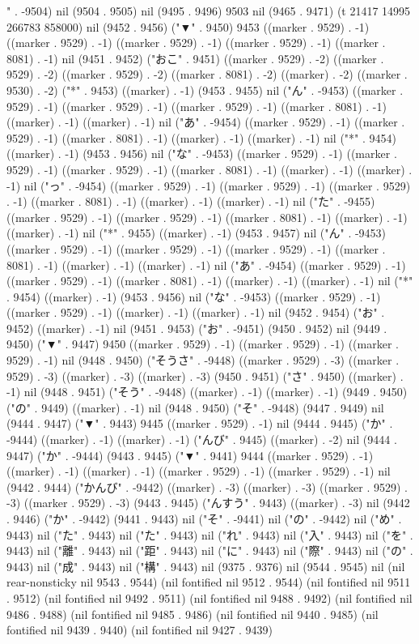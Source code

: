 " . -9504) nil (9504 . 9505) nil (9495 . 9496) 9503 nil (9465 . 9471) (t 21417 14995 266783 858000) nil (9452 . 9456) ("▼" . 9450) 9453 ((marker . 9529) . -1) ((marker . 9529) . -1) ((marker . 9529) . -1) ((marker . 9529) . -1) ((marker . 8081) . -1) nil (9451 . 9452) ("おこ" . 9451) ((marker . 9529) . -2) ((marker . 9529) . -2) ((marker . 9529) . -2) ((marker . 8081) . -2) ((marker) . -2) ((marker . 9530) . -2) ("*" . 9453) ((marker) . -1) (9453 . 9455) nil ("ん" . -9453) ((marker . 9529) . -1) ((marker . 9529) . -1) ((marker . 9529) . -1) ((marker . 8081) . -1) ((marker) . -1) ((marker) . -1) nil ("あ" . -9454) ((marker . 9529) . -1) ((marker . 9529) . -1) ((marker . 8081) . -1) ((marker) . -1) ((marker) . -1) nil ("*" . 9454) ((marker) . -1) (9453 . 9456) nil ("な" . -9453) ((marker . 9529) . -1) ((marker . 9529) . -1) ((marker . 9529) . -1) ((marker . 8081) . -1) ((marker) . -1) ((marker) . -1) nil ("っ" . -9454) ((marker . 9529) . -1) ((marker . 9529) . -1) ((marker . 9529) . -1) ((marker . 8081) . -1) ((marker) . -1) ((marker) . -1) nil ("た" . -9455) ((marker . 9529) . -1) ((marker . 9529) . -1) ((marker . 8081) . -1) ((marker) . -1) ((marker) . -1) nil ("*" . 9455) ((marker) . -1) (9453 . 9457) nil ("ん" . -9453) ((marker . 9529) . -1) ((marker . 9529) . -1) ((marker . 9529) . -1) ((marker . 8081) . -1) ((marker) . -1) ((marker) . -1) nil ("あ" . -9454) ((marker . 9529) . -1) ((marker . 9529) . -1) ((marker . 8081) . -1) ((marker) . -1) ((marker) . -1) nil ("*" . 9454) ((marker) . -1) (9453 . 9456) nil ("な" . -9453) ((marker . 9529) . -1) ((marker . 9529) . -1) ((marker) . -1) ((marker) . -1) nil (9452 . 9454) ("お" . 9452) ((marker) . -1) nil (9451 . 9453) ("お" . -9451) (9450 . 9452) nil (9449 . 9450) ("▼" . 9447) 9450 ((marker . 9529) . -1) ((marker . 9529) . -1) ((marker . 9529) . -1) nil (9448 . 9450) ("そうさ" . -9448) ((marker . 9529) . -3) ((marker . 9529) . -3) ((marker) . -3) ((marker) . -3) (9450 . 9451) ("さ" . 9450) ((marker) . -1) nil (9448 . 9451) ("そう" . -9448) ((marker) . -1) ((marker) . -1) (9449 . 9450) ("の" . 9449) ((marker) . -1) nil (9448 . 9450) ("そ" . -9448) (9447 . 9449) nil (9444 . 9447) ("▼" . 9443) 9445 ((marker . 9529) . -1) nil (9444 . 9445) ("か" . -9444) ((marker) . -1) ((marker) . -1) ("んび" . 9445) ((marker) . -2) nil (9444 . 9447) ("か" . -9444) (9443 . 9445) ("▼" . 9441) 9444 ((marker . 9529) . -1) ((marker) . -1) ((marker) . -1) ((marker . 9529) . -1) ((marker . 9529) . -1) nil (9442 . 9444) ("かんび" . -9442) ((marker) . -3) ((marker) . -3) ((marker . 9529) . -3) ((marker . 9529) . -3) (9443 . 9445) ("んすう" . 9443) ((marker) . -3) nil (9442 . 9446) ("か" . -9442) (9441 . 9443) nil ("そ" . -9441) nil ("の" . -9442) nil ("め" . 9443) nil ("た" . 9443) nil ("た" . 9443) nil ("れ" . 9443) nil ("入" . 9443) nil ("を" . 9443) nil ("離" . 9443) nil ("距" . 9443) nil ("に" . 9443) nil ("際" . 9443) nil ("の" . 9443) nil ("成" . 9443) nil ("構" . 9443) nil (9375 . 9376) nil (9544 . 9545) nil (nil rear-nonsticky nil 9543 . 9544) (nil fontified nil 9512 . 9544) (nil fontified nil 9511 . 9512) (nil fontified nil 9492 . 9511) (nil fontified nil 9488 . 9492) (nil fontified nil 9486 . 9488) (nil fontified nil 9485 . 9486) (nil fontified nil 9440 . 9485) (nil fontified nil 9439 . 9440) (nil fontified nil 9427 . 9439) 